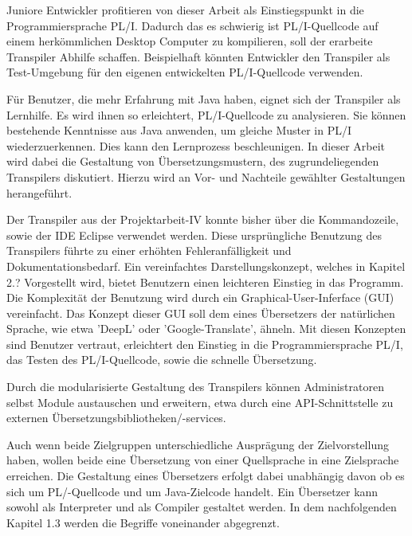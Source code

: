 Juniore Entwickler profitieren von dieser Arbeit als Einstiegspunkt in die Programmiersprache PL/I. Dadurch das es schwierig ist PL/I-Quellcode auf einem herkömmlichen Desktop Computer zu kompilieren, soll der erarbeite Transpiler Abhilfe schaffen. Beispielhaft könnten Entwickler den Transpiler als Test-Umgebung für den eigenen entwickelten PL/I-Quellcode verwenden.

Für Benutzer, die mehr Erfahrung mit Java haben, eignet sich der Transpiler als Lernhilfe. Es wird ihnen so erleichtert, PL/I-Quellcode zu analysieren. Sie können bestehende Kenntnisse aus Java anwenden, um gleiche Muster in PL/I wiederzuerkennen. Dies kann den Lernprozess beschleunigen. In dieser Arbeit wird dabei die Gestaltung von Übersetzungsmustern, des zugrundeliegenden Transpilers diskutiert. Hierzu wird an Vor- und Nachteile gewählter Gestaltungen herangeführt.

Der Transpiler aus der Projektarbeit-IV konnte bisher über die Kommandozeile, sowie der IDE Eclipse verwendet werden. Diese ursprüngliche Benutzung des Transpilers führte zu einer erhöhten Fehleranfälligkeit und Dokumentationsbedarf. Ein vereinfachtes Darstellungskonzept, welches in Kapitel 2.? Vorgestellt wird, bietet  Benutzern einen leichteren Einstieg in das Programm.
Die Komplexität der Benutzung wird durch ein Graphical-User-Inferface (GUI) vereinfacht. Das Konzept dieser GUI soll dem eines Übersetzers der natürlichen Sprache, wie etwa 'DeepL' oder 'Google-Translate', ähneln. Mit diesen Konzepten sind Benutzer vertraut, erleichtert den Einstieg in die Programmiersprache PL/I, das Testen des PL/I-Quellcode, sowie die schnelle Übersetzung.

Durch die modularisierte Gestaltung des Transpilers können Administratoren selbst Module austauschen und erweitern, etwa durch eine API-Schnittstelle zu externen Übersetzungsbibliotheken/-services. 

Auch wenn beide Zielgruppen unterschiedliche Ausprägung der Zielvorstellung haben, wollen beide eine Übersetzung von einer Quellsprache in eine Zielsprache erreichen. Die Gestaltung eines Übersetzers erfolgt dabei unabhängig davon ob es sich um PL/-Quellcode und um Java-Zielcode handelt. Ein Übersetzer kann sowohl als Interpreter und als Compiler gestaltet werden. In dem nachfolgenden Kapitel 1.3 werden die Begriffe voneinander abgegrenzt. 
	

